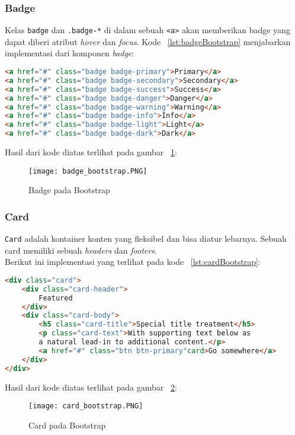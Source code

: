 \subsubsection{Badge}
Kelas \texttt{badge} dan \texttt{.badge-*} di dalam sebuah \texttt{<a>} akan memberikan badge yang dapat diberi atribut \textit{hover} dan \textit{focus}. Kode ~\ref{lst:badgeBootstrap} menjabarkan implementasi dari komponen \textit{badge}:
\begin{lstlisting}[style=customhtml, language=HTML,  basicstyle=\ttfamily, frame=single, columns=fullflexible, keepspaces=true, breaklines=true, showstringspaces=false, label={lst:badgeBootstrap}, caption=Badge pada bootstrap 4.] 
<a href="#" class="badge badge-primary">Primary</a>
<a href="#" class="badge badge-secondary">Secondary</a>
<a href="#" class="badge badge-success">Success</a>
<a href="#" class="badge badge-danger">Danger</a>
<a href="#" class="badge badge-warning">Warning</a>
<a href="#" class="badge badge-info">Info</a>
<a href="#" class="badge badge-light">Light</a>
<a href="#" class="badge badge-dark">Dark</a>
\end{lstlisting}
\noindent Hasil dari kode diatas terlihat pada gambar ~\ref{fig:badgeBootstrap}:
\begin{figure} [H]
	\centering  
	\texttt{[image: badge\_bootstrap.PNG]}  
	\caption{Badge pada Bootstrap} 
	\label{fig:badgeBootstrap}
\end{figure}

\subsubsection{Card}
\texttt{Card} adalah kontainer konten yang fleksibel dan bisa diatur lebarnya. Sebuah card memiliki sebuah \textit{headers} dan \textit{footers}. \\
Berikut ini implementasi yang terlihat pada kode ~\ref{lst:cardBootstrap}:
\begin{lstlisting}[style=customhtml, language=HTML,  basicstyle=\ttfamily, frame=single, columns=fullflexible, keepspaces=true, breaklines=true, showstringspaces=false, label={lst:cardBootstrap}, caption=Card pada bootstrap 4.] 
<div class="card">
	<div class="card-header">
		Featured
	</div>
	<div class="card-body">
		<h5 class="card-title">Special title treatment</h5>
		<p class="card-text">With supporting text below as 
		a natural lead-in to additional content.</p>
		<a href="#" class="btn btn-primary"card>Go somewhere</a>
	</div>
</div>
\end{lstlisting}
\noindent Hasil dari kode diatas terlihat pada gambar ~\ref{fig:cardBootstrap}:
\begin{figure} [H]
	\centering  
	\texttt{[image: card\_bootstrap.PNG]}  
	\caption{Card pada Bootstrap} 
	\label{fig:cardBootstrap}
\end{figure}

